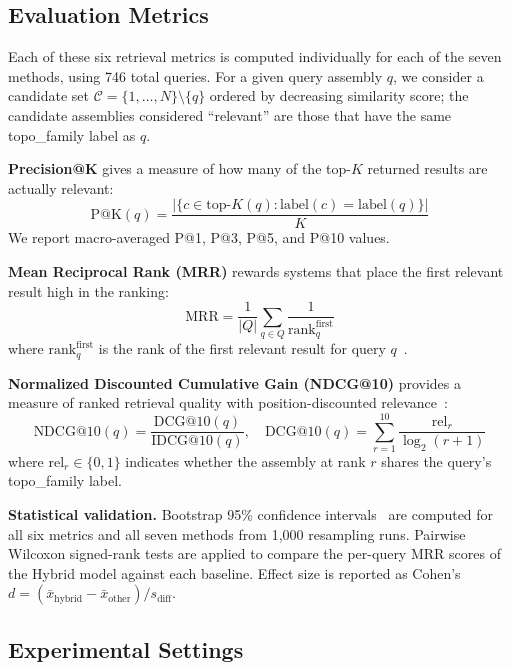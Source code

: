 \documentclass[preprint,12pt]{elsarticle}
\begin{document}
\subsection{Evaluation Metrics}

Each of these six retrieval metrics is computed individually for each of the seven methods, using 746 total queries.
For a given query assembly $q$, we consider a candidate set $\mathcal{C} = \{1, \ldots, N\} \setminus \{q\}$ ordered by decreasing similarity score; the candidate assemblies considered ``relevant'' are those that have the same topo\_family label as $q$.

\textbf{Precision@K} gives a measure of how many of the top-$K$ returned results are actually relevant:
\begin{equation}
\text{P@K}(q) = \frac{|\{c \in \text{top-}K(q) : \text{label}(c) = \text{label}(q)\}|}{K}
\label{Eq:PrecAtK}
\end{equation}
We report macro-averaged P@1, P@3, P@5, and P@10 values.

\textbf{Mean Reciprocal Rank (MRR)} rewards systems that place the first relevant result high in the ranking:
\begin{equation}
\text{MRR} = \frac{1}{|Q|} \sum_{q \in Q} \frac{1}{\text{rank}_q^{\text{first}}}
\label{Eq:MRR}
\end{equation}
where $\text{rank}_q^{\text{first}}$ is the rank of the first relevant result for query $q$~\cite{Manning2008}.

\textbf{Normalized Discounted Cumulative Gain (NDCG@10)} provides a measure of ranked retrieval quality with position-discounted relevance~\cite{Manning2008}:
\begin{equation}
\text{NDCG@10}(q) = \frac{\text{DCG@10}(q)}{\text{IDCG@10}(q)}, \quad \text{DCG@10}(q) = \sum_{r=1}^{10} \frac{\text{rel}_r}{\log_2(r+1)}
\label{Eq:NDCG}
\end{equation}
where $\text{rel}_r \in \{0,1\}$ indicates whether the assembly at rank $r$ shares the query's topo\_family label.

\textbf{Statistical validation.} Bootstrap 95\% confidence intervals~\cite{Efron1993} are computed for all six metrics and all seven methods from 1,000 resampling runs.
Pairwise Wilcoxon signed-rank tests are applied to compare the per-query MRR scores of the Hybrid model against each baseline.
Effect size is reported as Cohen's $d = (\bar{x}_{\text{hybrid}} - \bar{x}_{\text{other}}) / s_{\text{diff}}$.

\subsection{Experimental Settings}
\end{document}
